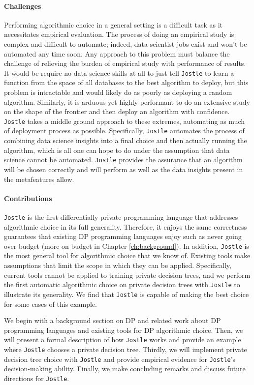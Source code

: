 \documentclass[11pt]{report}
\newcommand{\Jostle}{\texttt{Jostle}}
\begin{document}
\paragraph{Challenges}
Performing algorithmic choice in a general setting is a difficult task as it necessitates empirical evaluation. The process of doing an empirical study is complex and difficult to automate; indeed, data scientist jobs exist and won't be automated any time soon. Any approach to this problem must balance the challenge of relieving the burden of empirical study with performance of results. It would be require no data science skills at all to just tell \Jostle{} to learn a function from the space of all databases to the best algorithm to deploy, but this problem is intractable and would likely do as poorly as deploying a random algorithm. Similarly, it is arduous yet highly performant to do an extensive study on the shape of the frontier and then deploy an algorithm with confidence. \Jostle{} takes a middle ground approach to these extremes, automating as much of deployment process as possible. Specifically, \Jostle{} automates the process of combining data science insights into a final choice and then actually running the algorithm, which is all one can hope to do under the assumption that data science cannot be automated. \Jostle{} provides the assurance that an algorithm will be chosen correctly and will perform as well as the data insights present in the metafeatures allow. 

\paragraph{Contributions} \Jostle{} is the first differentially private programming language that addresses algorithmic choice in its full generality. Therefore, it enjoys the same correctness guarantees that existing DP programming languages enjoy such as never going over budget (more on budget in Chapter \ref{ch:background}). In addition, \Jostle{} is the most general tool for algorithmic choice that we know of. Existing tools make assumptions that limit the scope in which they can be applied. Specifically, current tools cannot be applied to training private decision trees, and we perform the first automatic algorithmic choice on private decision trees with \Jostle{} to illustrate its generality. We find that \Jostle{} is capable of making the best choice for some cases of this example.

We begin with a background section on DP and related work about DP programming languages and existing tools for DP algorithmic choice. Then, we will present a formal description of how \Jostle{} works and provide an example where \Jostle{} chooses a private decision tree. Thirdly, we will implement private decision tree choice with \Jostle{} and provide empirical evidence for \Jostle{}'s decision-making ability. Finally, we make concluding remarks and discuss future directions for \Jostle{}.
\end{document}
